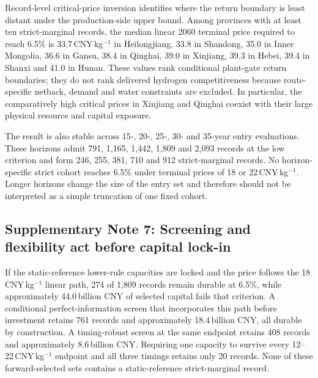 \documentclass[11pt,a4paper]{article}
\begin{document}
Record-level critical-price inversion identifies where the return boundary is least distant under the production-side upper bound. Among provinces with at least ten strict-marginal records, the median linear 2060 terminal price required to reach 6.5\% is 33.7\,CNY\,kg$^{-1}$ in Heilongjiang, 33.8 in Shandong, 35.0 in Inner Mongolia, 36.6 in Gansu, 38.4 in Qinghai, 39.0 in Xinjiang, 39.3 in Hebei, 39.4 in Shanxi and 41.0 in Hunan. These values rank conditional plant-gate return boundaries; they do not rank delivered hydrogen competitiveness because route-specific netback, demand and water constraints are excluded. In particular, the comparatively high critical prices in Xinjiang and Qinghai coexist with their large physical resource and capital exposure.

The result is also stable across 15-, 20-, 25-, 30- and 35-year entry evaluations. These horizons admit 791, 1,165, 1,442, 1,809 and 2,093 records at the low criterion and form 246, 255, 381, 710 and 912 strict-marginal records. No horizon-specific strict cohort reaches 6.5\% under terminal prices of 18 or 22\,CNY\,kg$^{-1}$. Longer horizons change the size of the entry set and therefore should not be interpreted as a simple truncation of one fixed cohort.

\subsection*{Supplementary Note 7: Screening and flexibility act before capital lock-in}

If the static-reference lower-rule capacities are locked and the price follows the 18\,CNY\,kg$^{-1}$ linear path, 274 of 1,809 records remain durable at 6.5\%, while approximately 44.0\,billion CNY of selected capital fails that criterion. A conditional perfect-information screen that incorporates this path before investment retains 761 records and approximately 18.4\,billion CNY, all durable by construction. A timing-robust screen at the same endpoint retains 408 records and approximately 8.6\,billion CNY. Requiring one capacity to survive every 12--22\,CNY\,kg$^{-1}$ endpoint and all three timings retains only 20 records. None of these forward-selected sets contains a static-reference strict-marginal record.
\end{document}
